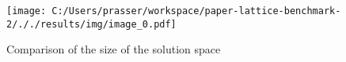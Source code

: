 \documentclass{article}
\begin{document}
	\begin{figure*}[!htbp]
		\centering
		\texttt{[image: C:/Users/prasser/workspace/paper-lattice-benchmark-2/././results/img/image\_0.pdf]}
		\caption{Comparison of the size of the solution space}
	\end{figure*}
	\clearpage
\end{document}

